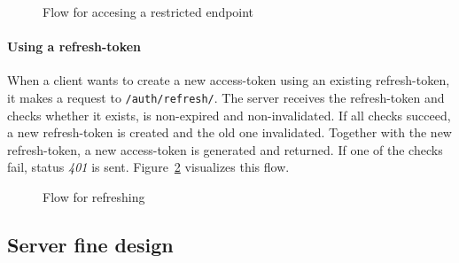 \begin{figure}
    \centering

    \caption{Flow for accesing a restricted endpoint}
    \label{fig:using-access-token}
\end{figure}

\paragraph{Using a refresh-token}
When a client wants to create a new access-token using an existing refresh-token, it makes a request to \texttt{/auth/refresh/}.
The server receives the refresh-token and checks whether it exists, is non-expired and non-invalidated.
If all checks succeed, a new refresh-token is created and the old one invalidated.
Together with the new refresh-token, a new access-token is generated and returned.
If one of the checks fail, status \textit{401} is sent. \newline
Figure~\ref{fig:using-refresh-token} visualizes this flow.

\begin{figure}
    \centering

    \caption{Flow for refreshing}
    \label{fig:using-refresh-token}
\end{figure}

\subsection{Server fine design}\label{subsec:server-fine-design}

